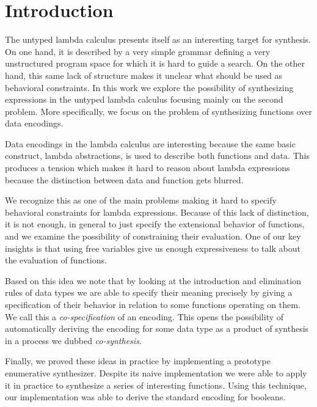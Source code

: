 \section{Introduction} \label{sec:intro}
%
The untyped lambda calculus presents itself as an interesting
target for synthesis.
%
On one hand, it is described by a very simple grammar
defining a very unstructured program space for which it is
hard to guide a search.
%
On the other hand, this same lack of structure makes it
unclear what should be used as behavioral constraints.
%
In this work we explore the possibility of synthesizing
expressions in the untyped lambda calculus focusing mainly
on the second problem.
%
More specifically, we focus on the problem of synthesizing
functions over data encodings.

Data encodings in the lambda calculus are interesting
because the same basic construct, lambda abstractions, is
used to describe both functions and data.
%
This produces a tension which makes it hard to reason about
lambda expressions because the distinction between data and
function gets blurred.

We recognize this as one of the main problems making it
hard to specify behavioral constraints for lambda
expressions.
%
Because of this lack of distinction, it is not enough, in
general to just specify the extensional behavior of
functions, and we examine the possibility of constraining
their evaluation.
%
One of our key insights is that using free variables give us
enough expressiveness to talk about the evaluation of
functions.

Based on this idea we note that by looking at the
introduction and elimination rules of data types we are able
to specify their meaning precisely by giving a specification
of their behavior in relation to some functions operating on
them.
%
We call this a \emph{co-specification} of an encoding.
%
This opens the possibility of automatically deriving the
encoding for some data type as a product of synthesis in a
process we dubbed \emph{co-synthesis}.

Finally, we proved these ideas in practice by implementing a
prototype enumerative synthesizer.
%
Despite its naive implementation we were able to apply it in
practice to synthesize a series of interesting functions.
%
Using this technique, our implementation was able to derive
the standard encoding for booleans.



